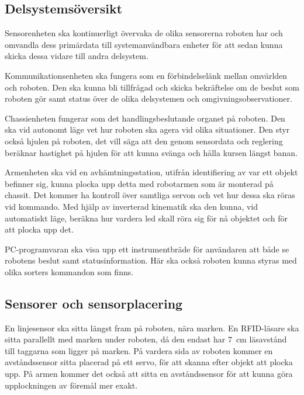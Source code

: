 \documentclass[a4paper,12pt]{article}
\begin{document}
\subsection{Delsystemsöversikt}
Sensorenheten ska kontinuerligt övervaka de olika sensorerna roboten har och omvandla dess primärdata till systemanvändbara enheter för att sedan kunna skicka dessa vidare till andra delsystem.

Kommunikationsenheten ska fungera som en förbindelselänk mellan omvärlden och roboten. Den ska kunna bli tillfrågad och skicka bekräftelse om de beslut som roboten gör samt status över de olika delsystemen och omgivningsobservationer.

Chassienheten fungerar som det handlingsbeslutande organet på roboten. Den ska vid autonomt läge vet hur roboten ska agera vid olika situationer. Den styr också hjulen på roboten, det vill säga att den genom sensordata och reglering beräknar hastighet på hjulen för att kunna svänga och hålla kursen längst banan.

Armenheten ska vid en avhämtningsstation, utifrån identifiering av var ett objekt befinner sig, kunna plocka upp detta med robotarmen som är monterad på chassit. Det kommer ha kontroll över samtliga servon och vet hur dessa ska röras vid kommando. Med hjälp av inverterad kinematik ska den kunna, vid automatiskt läge, beräkna hur vardera led skall röra sig för nå objektet och för att plocka upp det.

PC-programvaran ska visa upp ett instrumentbräde för användaren att både se robotens beslut samt statusinformation. Här ska också roboten kunna styras med olika sorters kommandon som finns.

\subsection{Sensorer och sensorplacering}

En linjesensor ska sitta längst fram på roboten, nära marken. En RFID-läsare ska sitta parallellt med marken under roboten, då den endast har 7~cm läsavstånd till taggarna som ligger på marken. På vardera sida av roboten kommer en avståndssensor sitta placerad på ett servo, för att skanna efter objekt att plocka upp. På armen kommer det också att sitta en avståndssensor för att kunna göra upplockningen av föremål mer exakt.

\newpage

\newpage

\newpage

\newpage

\newpage

\newpage


\newpage
\appendix


\end{document}
